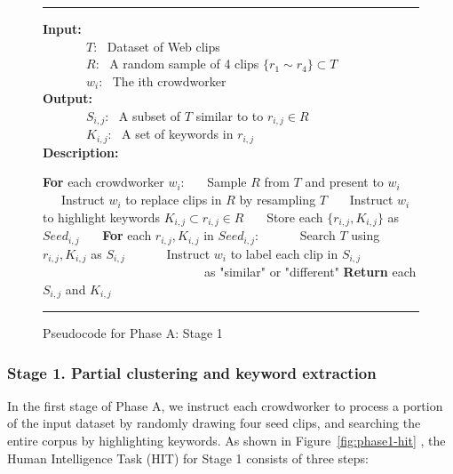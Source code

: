\begin{figure}
\footnotesize
\hrule
\vspace{2 pt}
\textbf{Input:}\\
\indent \ \ \ \ \ \ \ $T$: \ Dataset of Web clips\\
\indent \ \ \ \ \ \ \ $R$: \ A random sample of 4 clips $\{r_1 \sim r_4\} \subset T$ \\
\indent \ \ \ \ \ \ \ $w_i$: \ The ith crowdworker\\
\textbf{Output:} \\
\indent \ \ \ \ \ \ \ $S_{i,j}$: \ A subset of $T$ similar to to $r_{i,j} \in R$\\
\indent \ \ \ \ \ \ \ $K_{i,j}$: \ A set of keywords in $r_{i,j}$ \\
\textbf{Description:}
\begin{algorithmic}[1]
\STATE \textbf{For} each crowdworker $w_i$:
   \STATE \ \ \  Sample $R$ from $T$ and present to $w_i$
   \STATE \ \ \  Instruct $w_i$ to replace clips in $R$ by resampling $T$
   \STATE \ \ \  Instruct $w_i$ to highlight keywords $K_{i,j} \subset r_{i,j} \in R$
   \STATE \ \ \  Store each $\{r_{i,j}, K_{i,j}\}$ as $Seed_{i,j}$
\vspace{1mm}
\STATE \ \ \ \textbf{For} each $r_{i,j}, K_{i,j}$ in $Seed_{i,j}$:
   \STATE  \ \ \ \ \ \ Search $T$ using $r_{i,j}, K_{i,j}$ as $S_{i,j}$
   \STATE  \ \ \ \ \ \ Instruct $w_i$ to label each clip in $S_{i,j}$ \\
   \ \ \ \ \ \ \ \ \ \ \ \ \ \ \ \ \ \ \ \ \ \ \ \ \ \ as "similar" or "different"
\STATE \textbf{Return} each $S_{i,j}$ and $K_{i,j}$
\end{algorithmic}
\hrule
\label{fig:phaseAstage1}
\caption{Pseudocode for Phase A: Stage 1}
\end{figure}


\subsubsection{Stage 1. Partial clustering and keyword extraction}

In the first stage of Phase A, we instruct each crowdworker to process a
portion of the input dataset by randomly drawing four seed clips, and searching
the entire corpus by highlighting keywords.  As shown in
Figure~\ref{fig:phase1-hit} , the Human Intelligence Task (HIT) for Stage 1
consists of three steps:


